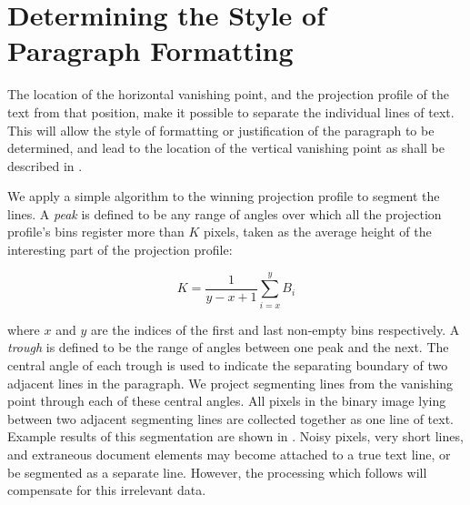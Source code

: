 

\section{Determining the Style of Paragraph Formatting} \label{sec-parags}

The location of the horizontal vanishing point, and the projection profile of
the text from that position, make it possible to separate the individual lines
of text.  This will allow the style of formatting or justification of the
paragraph to be determined, and lead to the location of the vertical vanishing
point as shall be described in .

We apply a simple algorithm to the winning projection profile to segment the
lines.  A {\em peak} is defined to be any range of angles over which all the
projection profile's bins register more than $K$ pixels, taken as the average
height of the interesting part of the projection profile:

\begin{equation}
K= \frac{1}{y-x+1} \sum_{i=x}^{y}B_i
\end{equation}

{\parindent 0mm
where $x$ and $y$ are the indices of the first and last non-empty bins respectively.
A {\em trough} is defined to be the range of angles between one peak and the next.  
The central angle of each trough is used to indicate the separating boundary of
two adjacent lines in the paragraph.  We project segmenting lines from the
vanishing point through each of these central angles.
All pixels in the binary image lying between two adjacent segmenting
lines are collected together as one line of text. Example results of this
segmentation are shown in .
Noisy pixels, very short lines, and extraneous document
elements may become attached to a true text line, or be segmented as a separate
line.  However, the processing which follows will compensate for this irrelevant
data. 
} 


